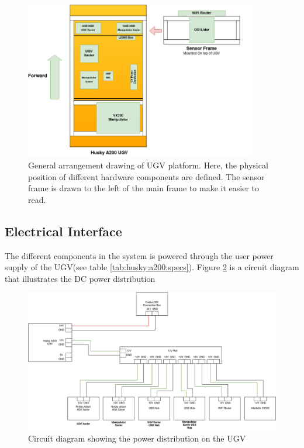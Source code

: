 \begin{figure}[H]
  \centering
   \includegraphics[width = 0.9\textwidth]{Figures/general_arrangement.drawio.png}
  \caption{General arrangement drawing of UGV platform. Here, the physical position of different hardware components are defined. The sensor frame is drawn to the left of the main frame to make it easier to read.}
  \label{fig:general_arrangement}
\end{figure}


\subsection{Electrical Interface}
The different components in the system is powered through the user power supply of the UGV(see table \ref{tab:husky:a200:specs}). Figure \ref{fig:circuit_diagram} is a circuit diagram that illustrates the DC power distribution 

\begin{figure}[H]
  \centering
  \includegraphics[width = 1\textwidth]{Figures/electrical_interface.drawio.png}
  \caption{Circuit diagram showing the power distribution on the UGV}
  \label{fig:circuit_diagram}
\end{figure}


